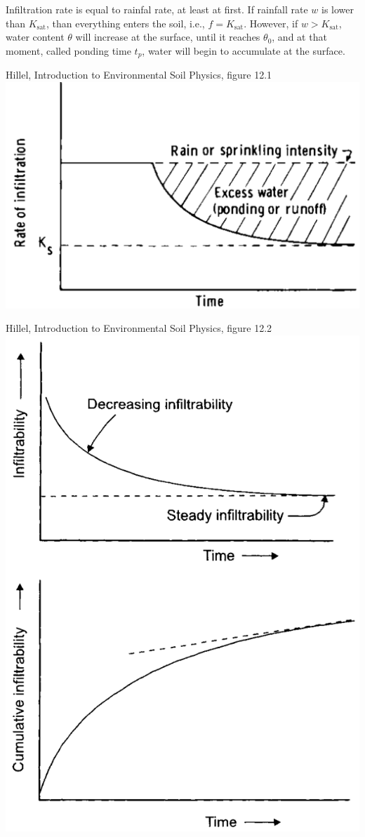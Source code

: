 \documentclass[
  letterpaper,
  DIV=11,
  numbers=noendperiod]{scrreprt}
\begin{document}
Infiltration rate is equal to rainfal rate, at least at first. If
rainfall rate \(w\) is lower than \(K_\text{sat}\), than everything
enters the soil, i.e., \(f=K_\text{sat}\). However, if
\(w>K_\text{sat}\), water content \(\theta\) will increase at the
surface, until it reaches \(\theta_0\), and at that moment, called
ponding time \(t_p\), water will begin to accumulate at the surface.

Hillel, Introduction to Environmental Soil Physics, figure 12.1
\includegraphics{archive/figures/hillel_introduction_soil_physics_figure12.1.png}

Hillel, Introduction to Environmental Soil Physics, figure 12.2
\includegraphics{archive/figures/hillel_introduction_soil_physics_figure12.2.png}
\end{document}
